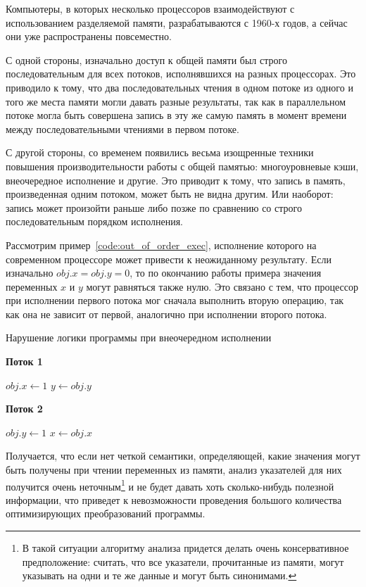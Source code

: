 \documentclass[14pt,titlepage,draft]{extarticle}
\newcommand{\algorithmictitle}[1]{\hspace{8mm}\textbf{#1}}
\begin{document}
    Компьютеры, в которых несколько процессоров взаимодействуют с
    использованием разделяемой памяти, разрабатываются с 1960-х годов, а
    сейчас они уже распространены повсеместно.

    С одной стороны, изначально доступ к общей памяти был строго
    последовательным для всех потоков, исполнявшихся на разных процессорах.
    Это приводило к тому, что два последовательных чтения в одном потоке из
    одного и того же места памяти могли давать разные результаты, так как в
    параллельном потоке могла быть совершена запись в эту же самую память в
    момент времени между последовательными чтениями в первом потоке.

    С другой стороны, со временем появились весьма изощренные техники
    повышения производительности работы с общей памятью: многоуровневые кэши,
    внеочередное исполнение  и другие.
    Это приводит к тому, что запись в память, произведенная одним потоком,
    может быть не видна другим. Или наоборот: запись может произойти раньше
    либо позже по сравнению со строго последовательным порядком исполнения.

    Рассмотрим пример~\ref{code:out_of_order_exec}, исполнение которого на
    современном процессоре может привести к неожиданному результату.
    Если изначально $obj.x = obj.y = 0$, то по окончанию работы примера
    значения переменных $x$ и $y$ могут равняться также нулю. Это связано с
    тем, что процессор при исполнении первого потока мог сначала выполнить
    вторую операцию, так как она не зависит от первой, аналогично при
    исполнении второго потока.

    \begin{algorithm}
      \caption{Нарушение логики программы при внеочередном исполнении}
      \label{code:out_of_order_exec}
      \begin{multicols}{2}
        \algorithmictitle{Поток 1}
        \begin{algorithmic}[1]
          \State $obj.x \gets 1$
          \State $y \gets obj.y$
        \end{algorithmic}
        \columnbreak
        \algorithmictitle{Поток 2}
        \begin{algorithmic}[1]
          \State $obj.y \gets 1$
          \State $x \gets obj.x$
        \end{algorithmic}
      \end{multicols}
    \end{algorithm}

    Получается, что если нет четкой семантики, определяющей, какие значения
    могут быть получены при чтении переменных из памяти, анализ указателей
    для них получится очень неточным\footnote{
      В такой ситуации алгоритму анализа придется делать очень консервативное
      предположение: считать, что все указатели, прочитанные из памяти, могут
      указывать на одни и те же данные и могут быть синонимами.
    } и не будет давать хоть сколько-нибудь полезной информации, что приведет
    к невозможности проведения большого количества оптимизирующих
    преобразований программы.
\end{document}

